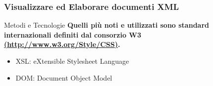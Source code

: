 \documentclass{beamer}
\begin{document}
    \begin{frame}
        \frametitle{Visualizzare ed Elaborare documenti XML}
        \addtocounter{nframe}{1}
        
        \begin{block}{Metodi e Tecnologie}
            \textbf{Quelli più noti e utilizzati sono standard internazionali definiti dal consorzio W3 \url{(http://www.w3.org/Style/CSS)}.}
           \begin{itemize}
            \item XSL: eXtensible Stylesheet Language
            \item DOM: Document Object Model
           \end{itemize}
        \end{block}
        
    \end{frame}

        
    
            
        
\end{document}
